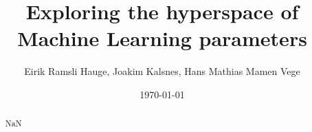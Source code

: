 \documentclass[11pt]{article}
\title{Exploring the hyperspace of Machine Learning parameters}
\author{Eirik Ramsli Hauge, Joakim Kalsnes, Hans Mathias Mamen Vege}
\date{\today}
\begin{document}
\maketitle

\begin{abstract}
NaN
\end{abstract}


















\end{document}
